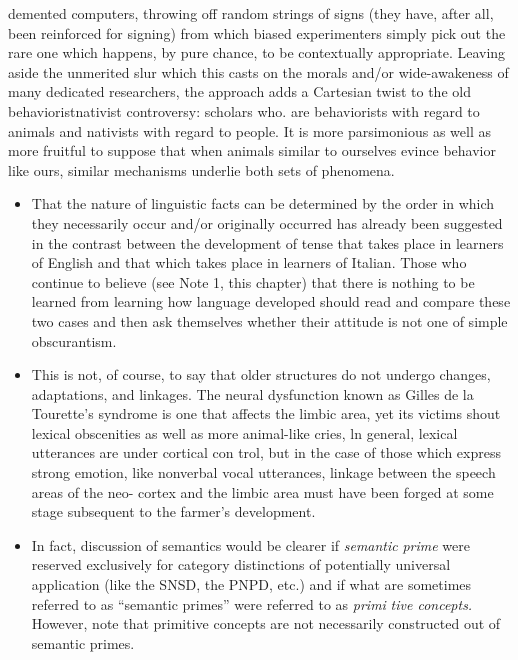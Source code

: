 \begin{itemize}
\begin{itemize}
\begin{itemize}
\begin{itemize}
\begin{itemize}
\begin{itemize}
\begin{itemize}
\begin{itemize}
\begin{itemize}
\begin{itemize}
\begin{itemize}
\begin{itemize}
demented computers, throwing off random strings of signs (they have, after all, been reinforced for signing) from which biased experimenters simply pick out the rare one which happens, by pure chance, to be contextually appropriate. Leaving aside the unmerited slur which this casts on the morals and/or wide-awakeness of many dedicated re\-searchers, the approach adds a Cartesian twist to the old behaviorist\-nativist controversy: scholars who. are behaviorists with regard to animals and nativists with regard to people. It is more parsimonious as well as more fruitful to suppose that when animals similar to our\-selves evince behavior like ours, similar mechanisms underlie both sets of phenomena.

\begin{itemize}
\item That the nature of linguistic facts can be determined by the order in which they necessarily occur and/or originally occurred has already been suggested in the contrast between the development of tense that takes place in learners of English and that which takes place in learners of Italian. Those who continue to believe (see Note 1, this chapter) that there is nothing to be learned from learning how language developed should read and compare these two cases and then ask themselves whether their attitude is not one of simple obscurantism.
\item This is not, of course, to say that older structures do not undergo changes, adaptations, and linkages. The neural dysfunction known as Gilles de la Tourette's syndrome is one that affects the limbic area, yet its victims shout lexical obscenities as well as more animal-like cries, ln general, lexical utterances are under cortical con trol, but in the case of those which express strong emotion, like non\-verbal vocal utterances, linkage between the speech areas of the neo- cortex and the limbic area must have been forged at some stage sub\-sequent to the farmer's development.
\item In fact, discussion of semantics would be clearer if \textit{semantic} \textit{prime} were reserved exclusively for category distinctions of potentially universal application (like the SNSD, the PNPD, etc.) and if what are sometimes referred to as ``semantic primes'' were referred to as \textit{primi\-} \textit{tive concepts.} However, note that primitive concepts are not necessarily constructed out of semantic primes.
\end{itemize}


\end{itemize}
\end{itemize}
\end{itemize}
\end{itemize}
\end{itemize}
\end{itemize}
\end{itemize}
\end{itemize}
\end{itemize}
\end{itemize}
\end{itemize}
\end{itemize}
